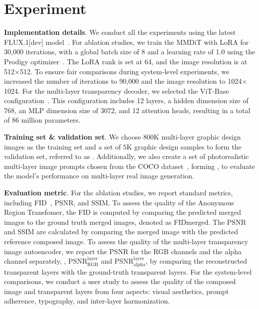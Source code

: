 \section{Experiment}

\vspace{1mm}
\noindent\textbf{Implementation details}. We conduct all the experiments using the latest FLUX.1[dev] model~\cite{flux}. For ablation studies, we train the MMDiT with LoRA for 30,000 iterations, with a global batch size of 8 and a learning rate of 1.0 using the Prodigy optimizer~\cite{mishchenko2023prodigy}. The LoRA rank is set at 64, and the image resolution is at 512$\times$512. To ensure fair comparisons during system-level experiments, we increased the number of iterations to 90,000 and the image resolution to 1024$\times$1024.
For the multi-layer transparency decoder, we selected the ViT-Base configuration~\cite{dosovitskiy2020image}. This configuration includes 12 layers, a hidden dimension size of 768, an MLP dimension size of 3072, and 12 attention heads, resulting in a total of 86 million parameters.


\vspace{1mm}
\noindent\textbf{Training set \& validation set}.
We choose $800$K multi-layer graphic design images as the training set and a set of $5$K graphic design samples to form the validation set, referred to as \designbenchmark. Additionally, we also create a set of photorealistic multi-layer image prompts chosen from the COCO dataset~\cite{lin2014microsoft}, forming \photobenchmark, to evaluate the model's performance on multi-layer real image generation.

\vspace{1mm}
\noindent\textbf{Evaluation metric}.
For the ablation studies, we report standard metrics, including FID~\cite{dowson1982frechet}, PSNR, and SSIM. 
To assess the quality of the Anonymous Region Transfomer, the FID is computed by comparing the predicted merged images to the ground truth merged images, denoted as FID${\scriptstyle\text{merged}}$. The PSNR and SSIM are calculated by comparing the merged image with the predicted reference composed image. 
To assess the quality of the multi-layer transparency image autoencoder, we report the PSNR for the RGB channels and the alpha channel separately, \ie, PSNR{$^{\textrm{layer}}_{\textrm{RGB}}$} and PSNR{$^{\textrm{layer}}_{\textrm{alpha}}$}, by comparing the reconstructed transparent layers with the ground-truth transparent layers. For the system-level comparisons, we conduct a user study to assess the quality of the composed image and transparent layers from four aspects: visual aesthetics, prompt adherence, typography, and inter-layer harmonization.

